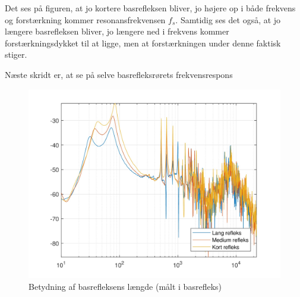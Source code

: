 Det ses på figuren, at jo kortere basrefleksen bliver, jo højere op i både frekvens og forstærkning kommer resonansfrekvensen $f_s$. Samtidig ses det også, at jo længere basrefleksen bliver, jo længere ned i frekvens kommer forstærkningsdykket til at ligge, men at forstærkningen under denne faktisk stiger.

Næste skridt er, at se på selve basrefleksrørets frekvensrespons
\begin{figure}[H]
	\centering
	\vspace{-12pt}
	\includegraphics[width=\textwidth]{Billeder/Grafer/BasrefleksLengthTube}
	\caption{Betydning af basrefleksens længde (målt i basrefleks)}
\end{figure}